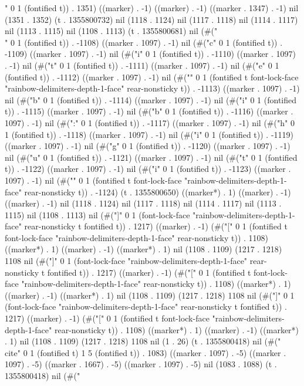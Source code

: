 " 0 1 (fontified t)) . 1351) ((marker) . -1) ((marker) . -1) ((marker . 1347) . -1) nil (1351 . 1352) (t . 1355800732) nil (1118 . 1124) nil (1117 . 1118) nil (1114 . 1117) nil (1113 . 1115) nil (1108 . 1113) (t . 1355800681) nil (#("\\" 0 1 (fontified t)) . -1108) ((marker . 1097) . -1) nil (#("c" 0 1 (fontified t)) . -1109) ((marker . 1097) . -1) nil (#("i" 0 1 (fontified t)) . -1110) ((marker . 1097) . -1) nil (#("t" 0 1 (fontified t)) . -1111) ((marker . 1097) . -1) nil (#("e" 0 1 (fontified t)) . -1112) ((marker . 1097) . -1) nil (#("{" 0 1 (fontified t font-lock-face "rainbow-delimiters-depth-1-face" rear-nonsticky t)) . -1113) ((marker . 1097) . -1) nil (#("b" 0 1 (fontified t)) . -1114) ((marker . 1097) . -1) nil (#("i" 0 1 (fontified t)) . -1115) ((marker . 1097) . -1) nil (#("b" 0 1 (fontified t)) . -1116) ((marker . 1097) . -1) nil (#(":" 0 1 (fontified t)) . -1117) ((marker . 1097) . -1) nil (#("h" 0 1 (fontified t)) . -1118) ((marker . 1097) . -1) nil (#("i" 0 1 (fontified t)) . -1119) ((marker . 1097) . -1) nil (#("g" 0 1 (fontified t)) . -1120) ((marker . 1097) . -1) nil (#("u" 0 1 (fontified t)) . -1121) ((marker . 1097) . -1) nil (#("t" 0 1 (fontified t)) . -1122) ((marker . 1097) . -1) nil (#("i" 0 1 (fontified t)) . -1123) ((marker . 1097) . -1) nil (#("}" 0 1 (fontified t font-lock-face "rainbow-delimiters-depth-1-face" rear-nonsticky t)) . -1124) (t . 1355800650) ((marker*) . 1) ((marker) . -1) ((marker) . -1) nil (1118 . 1124) nil (1117 . 1118) nil (1114 . 1117) nil (1113 . 1115) nil (1108 . 1113) nil (#("]" 0 1 (font-lock-face "rainbow-delimiters-depth-1-face" rear-nonsticky t fontified t)) . 1217) ((marker) . -1) (#("[" 0 1 (fontified t font-lock-face "rainbow-delimiters-depth-1-face" rear-nonsticky t)) . 1108) ((marker*) . 1) ((marker) . -1) ((marker*) . 1) nil (1108 . 1109) (1217 . 1218) 1108 nil (#("]" 0 1 (font-lock-face "rainbow-delimiters-depth-1-face" rear-nonsticky t fontified t)) . 1217) ((marker) . -1) (#("[" 0 1 (fontified t font-lock-face "rainbow-delimiters-depth-1-face" rear-nonsticky t)) . 1108) ((marker*) . 1) ((marker) . -1) ((marker*) . 1) nil (1108 . 1109) (1217 . 1218) 1108 nil (#("]" 0 1 (font-lock-face "rainbow-delimiters-depth-1-face" rear-nonsticky t fontified t)) . 1217) ((marker) . -1) (#("[" 0 1 (fontified t font-lock-face "rainbow-delimiters-depth-1-face" rear-nonsticky t)) . 1108) ((marker*) . 1) ((marker) . -1) ((marker*) . 1) nil (1108 . 1109) (1217 . 1218) 1108 nil (1 . 26) (t . 1355800418) nil (#("\\cite" 0 1 (fontified t) 1 5 (fontified t)) . 1083) ((marker . 1097) . -5) ((marker . 1097) . -5) ((marker . 1667) . -5) ((marker . 1097) . -5) nil (1083 . 1088) (t . 1355800418) nil (#("
